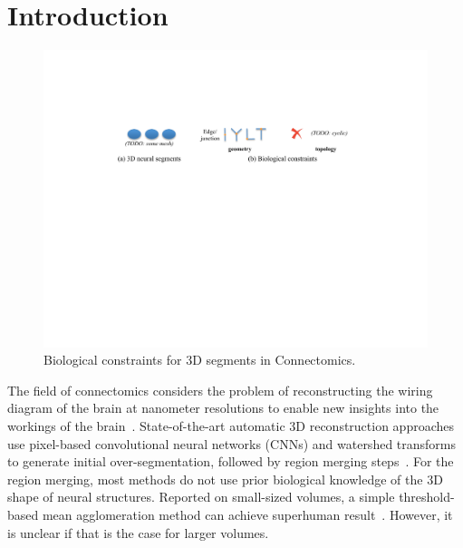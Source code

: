 \section{Introduction}

\begin{figure}[t]
	\centering
	\includegraphics[width=\linewidth]{./figures/bc/teaser_bc_v2.pdf}
	\caption{Biological constraints for 3D segments in Connectomics.}
	\label{fig:biological_constraints}
\end{figure}


The field of connectomics considers the problem of reconstructing the wiring diagram of the brain at nanometer resolutions to enable new insights into the workings of the brain~\cite{haehn2017scalable,kasthuri2015saturated}. 
State-of-the-art automatic 3D reconstruction approaches use pixel-based convolutional neural networks (CNNs) and watershed transforms to generate initial over-segmentation, followed by region merging steps~\cite{seymour2016rhoananet,lee2015recursive,nunez2014graph,parag2017anisotropic,ronneberger2015u,zlateski2015image}.
For the region merging, most methods do not use prior biological knowledge of the 3D shape of neural structures.
Reported on small-sized volumes, a simple threshold-based mean agglomeration method can achieve superhuman result~\cite{lee2017superhuman}.
However, it is unclear if that is the case for larger volumes.

